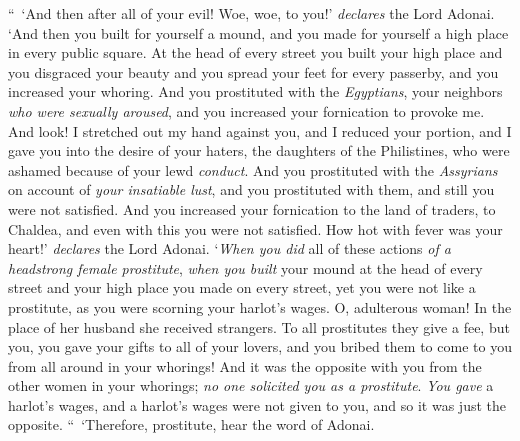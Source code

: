 \begin{biblechapter}
\verse “ ‘And then after all of your evil! Woe, woe, to you!’ \textit{declares} the Lord Adonai.
\verse ‘And then you built for yourself a mound, and you made for yourself a high place in every public square.
\verse At the head of every street you built your high place and you disgraced your beauty and you spread your feet for every passerby, and you increased your whoring.
\verse And you prostituted with the \textit{Egyptians}, your neighbors \textit{who were sexually aroused}, and you increased your fornication to provoke me.
\verse And look! I stretched out my hand against you, and I reduced your portion, and I gave you into the desire of your haters, the daughters of the Philistines, who were ashamed because of your lewd \textit{conduct}.
\verse And you prostituted with the \textit{Assyrians} on account of \textit{your insatiable lust}, and you prostituted with them, and still you were not satisfied.
\verse And you increased your fornication to the land of traders, to Chaldea, and even with this you were not satisfied.
\verse How hot with fever was your heart!’ \textit{declares} the Lord Adonai. ‘\textit{When you did} all of these actions \textit{of a headstrong female prostitute},
\verse \textit{when you built} your mound at the head of every street and your high place you made on every street, yet you were not like a prostitute, as you were scorning your harlot’s wages.
\verse O, adulterous woman! In the place of her husband she received strangers.
\verse To all prostitutes they give a fee, but you, you gave your gifts to all of your lovers, and you bribed them to come to you from all around in your whorings!
\verse And it was the opposite with you from the other women in your whorings; \textit{no one solicited you as a prostitute}. \textit{You gave} a harlot’s wages, and a harlot’s wages were not given to you, and so it was just the opposite.
\verse “ ‘Therefore, prostitute, hear the word of Adonai.

\end{biblechapter}

